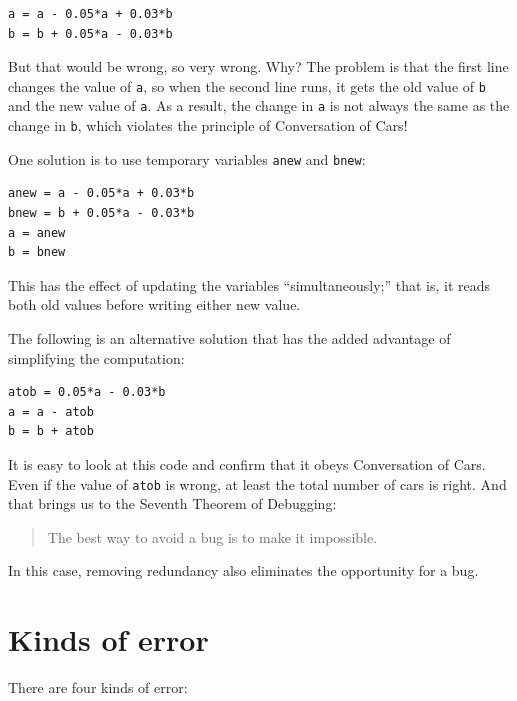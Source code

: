 \documentclass{book}
\begin{document}
\begin{verbatim}
a = a - 0.05*a + 0.03*b
b = b + 0.05*a - 0.03*b
\end{verbatim}

But that would be wrong, so very wrong.  Why?  The problem is that
the first line changes the value of {\tt a}, so when the second line
runs, it gets the old value of {\tt b} and the new value of {\tt a}.
As a result, the change in {\tt a} is not always the same as the
change in {\tt b}, which violates the principle of Conversation
of Cars!

One solution is to use temporary variables {\tt anew} and {\tt bnew}:

\begin{verbatim}
anew = a - 0.05*a + 0.03*b
bnew = b + 0.05*a - 0.03*b
a = anew
b = bnew
\end{verbatim}

This has the effect of updating the variables ``simultaneously;'' that
is, it reads both old values before writing either new value.

The following is an alternative solution that
has the added advantage of simplifying the computation:

\begin{verbatim}
atob = 0.05*a - 0.03*b
a = a - atob
b = b + atob
\end{verbatim}

It is easy to look at this code and confirm that it obeys Conversation
of Cars.  Even if the value of {\tt atob} is wrong, at least the total
number of cars is right.  And that brings us to the Seventh Theorem of
Debugging:

\begin{quote}
The best way to avoid a bug is to make it impossible.
\end{quote}

In this case, removing redundancy also eliminates the opportunity for
a bug.


\section{Kinds of error}

There are four kinds of error:
\end{document}
